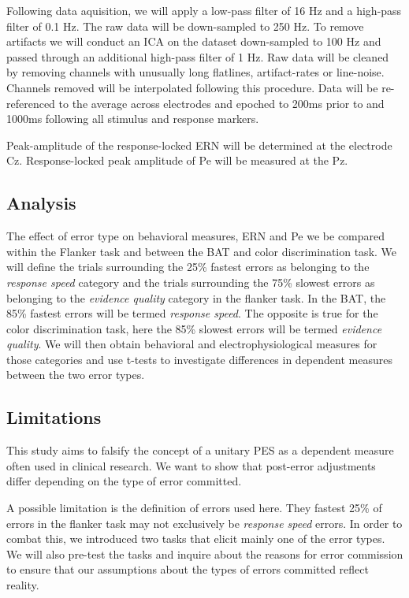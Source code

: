 \documentclass[
  man,floatsintext]{apa7}
\begin{document}
Following data aquisition, we will apply a low-pass filter of 16 Hz and a high-pass filter of 0.1 Hz. The raw data will be down-sampled to 250 Hz. To remove artifacts we will conduct an ICA on the dataset down-sampled to 100 Hz and passed through an additional high-pass filter of 1 Hz. Raw data will be cleaned by removing channels with unusually long flatlines, artifact-rates or line-noise. Channels removed will be interpolated following this procedure. Data will be re-referenced to the average across electrodes and epoched to 200ms prior to and 1000ms following all stimulus and response markers.

Peak-amplitude of the response-locked ERN will be determined at the electrode Cz. Response-locked peak amplitude of Pe will be measured at the Pz.

\hypertarget{analysis}{%
\subsection{Analysis}\label{analysis}}

The effect of error type on behavioral measures, ERN and Pe we be compared within the Flanker task and between the BAT and color discrimination task. We will define the trials surrounding the 25\% fastest errors as belonging to the \emph{response speed} category and the trials surrounding the 75\% slowest errors as belonging to the \emph{evidence quality} category in the flanker task. In the BAT, the 85\% fastest errors will be termed \emph{response speed}. The opposite is true for the color discrimination task, here the 85\% slowest errors will be termed \emph{evidence quality}. We will then obtain behavioral and electrophysiological measures for those categories and use t-tests to investigate differences in dependent measures between the two error types.

\hypertarget{limitations}{%
\subsection{Limitations}\label{limitations}}

This study aims to falsify the concept of a unitary PES as a dependent measure often used in clinical research. We want to show that post-error adjustments differ depending on the type of error committed.

A possible limitation is the definition of errors used here. They fastest 25\% of errors in the flanker task may not exclusively be \emph{response speed} errors. In order to combat this, we introduced two tasks that elicit mainly one of the error types. We will also pre-test the tasks and inquire about the reasons for error commission to ensure that our assumptions about the types of errors committed reflect reality.
\end{document}
